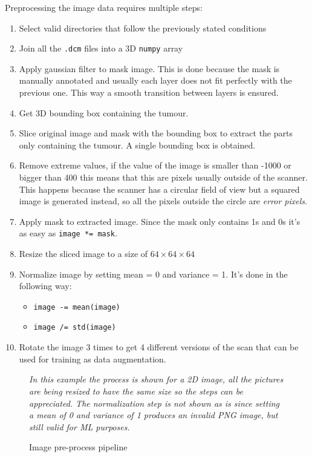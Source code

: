 Preprocessing the image data requires multiple steps:
\begin{enumerate}
  \item Select valid directories that follow the previously stated conditions
  \item Join all the \verb|.dcm| files into a 3D \verb|numpy| array
  \item Apply gaussian filter to mask image. This is done because the mask is manually annotated
        and usually each layer does not fit perfectly with the previous one. This way a smooth
        transition between layers is ensured.
  \item Get 3D bounding box containing the tumour.
  \item Slice original image and mask with the bounding box to extract the parts only containing
        the tumour. A single bounding box is obtained.
  \item Remove extreme values, if the value of the image is smaller than -1000 or bigger than
        400 this means that this are pixels usually outside of the scanner. This happens because
        the scanner has a circular field of view but a squared image is generated instead, so 
        all the pixels outside the circle are \emph{error pixels}.
  \item Apply mask to extracted image. Since the mask only contains 1s and 0s it's as easy 
        as \verb|image *= mask|.
  \item Resize the sliced image to a size of \( 64 \times 64 \times 64 \)
  \item Normalize image by setting mean = 0 and variance = 1. It's done in the following way:
  \begin{itemize}
    \item \verb|image -= mean(image)|
    \item \verb|image /= std(image)|
  \end{itemize}
  \item Rotate the image 3 times to get 4 different versions of the scan that can be used for 
        training as data augmentation.
\end{enumerate}

\begin{figure}
  \resizebox{\textwidth}{.7\textwidth}{
    
  }

  \caption{Image pre-process pipeline \label{fig:preprocess}}

  \it
  In this example the process is shown for a 2D image, all the pictures are being resized to 
  have the same size so the steps can be appreciated. The normalization step is not shown as is
  since setting a mean of 0 and variance of 1 produces an invalid \acrshort{PNG} image, but still valid
  for \gls{ML} purposes.
\end{figure}

